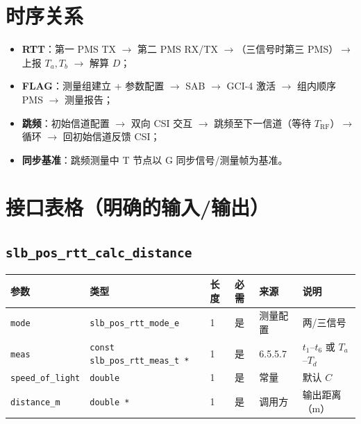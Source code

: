 \documentclass[11pt,a4paper]{ctexart}
\begin{document}
\section{时序关系}

\begin{itemize}[nosep]
  \item \textbf{RTT}：第一 PMS TX $\rightarrow$ 第二 PMS RX/TX $\rightarrow$（三信号时第三 PMS）$\rightarrow$ 上报 $T_a,T_b$ $\rightarrow$ 解算 $D$；
  \item \textbf{FLAG}：测量组建立 + 参数配置 $\rightarrow$ SAB $\rightarrow$ GCI-4 激活 $\rightarrow$ 组内顺序 PMS $\rightarrow$ 测量报告；
  \item \textbf{跳频}：初始信道配置 $\rightarrow$ 双向 CSI 交互 $\rightarrow$ 跳频至下一信道（等待 $T_{\mathrm{RF}}$）$\rightarrow$ 循环 $\rightarrow$ 回初始信道反馈 CSI；
  \item \textbf{同步基准}：跳频测量中 T 节点以 G 同步信号/测量帧为基准。
\end{itemize}

\section{接口表格（明确的输入/输出）}

\subsection{\texttt{slb\_pos\_rtt\_calc\_distance}}

\begin{longtable}{p{2.4cm}p{2.8cm}p{1.2cm}p{1.5cm}p{2.2cm}p{4.3cm}}
\toprule
\textbf{参数} & \textbf{类型} & \textbf{长度} & \textbf{必需} & \textbf{来源} & \textbf{说明} \\
\midrule
\endhead
\texttt{mode} & \texttt{slb\_pos\_rtt\_mode\_e} & 1 & 是 & 测量配置 & 两/三信号 \\
\texttt{meas} & \texttt{const slb\_pos\_rtt\_meas\_t *} & 1 & 是 & 6.5.5.7 & $t_1$--$t_6$ 或 $T_a$--$T_d$ \\
\texttt{speed\_of\_light} & \texttt{double} & 1 & 是 & 常量 & 默认 $C$ \\
\texttt{distance\_m} & \texttt{double *} & 1 & 是 & 调用方 & 输出距离（m） \\
\bottomrule
\end{longtable}
\end{document}
